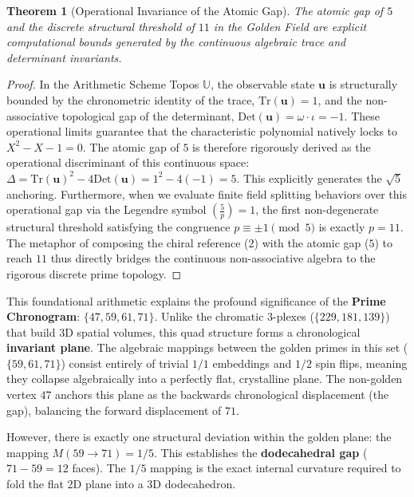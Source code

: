 \documentclass[12pt,oneside]{article}
\theoremstyle{principia}
\newtheorem{theorem}{Theorem}[section]
\theoremstyle{definition}
\theoremstyle{remark}
\begin{document}
\begin{theorem}[Operational Invariance of the Atomic Gap]
The atomic gap of $5$ and the discrete structural threshold of $11$ in the Golden Field are explicit computational bounds generated by the continuous algebraic trace and determinant invariants.
\end{theorem}

\begin{proof}
In the Arithmetic Scheme Topos $\mathbb{U}$, the observable state $\mathbf{u}$ is structurally bounded by the chronometric identity of the trace, $\mathrm{Tr}(\mathbf{u}) = 1$, and the non-associative topological gap of the determinant, $\mathrm{Det}(\mathbf{u}) = \omega \cdot \iota = -1$. These operational limits guarantee that the characteristic polynomial natively locks to $X^2 - X - 1 = 0$. The atomic gap of $5$ is therefore rigorously derived as the operational discriminant of this continuous space: $\Delta = \mathrm{Tr}(\mathbf{u})^2 - 4\mathrm{Det}(\mathbf{u}) = 1^2 - 4(-1) = 5$. This explicitly generates the $\sqrt{5}$ anchoring. Furthermore, when we evaluate finite field splitting behaviors over this operational gap via the Legendre symbol $\left(\frac{5}{p}\right) = 1$, the first non-degenerate structural threshold satisfying the congruence $p \equiv \pm 1 \pmod 5$ is exactly $p = 11$. The metaphor of composing the chiral reference ($2$) with the atomic gap ($5$) to reach $11$ thus directly bridges the continuous non-associative algebra to the rigorous discrete prime topology. \qedhere
\end{proof}

This foundational arithmetic explains the profound significance of the \textbf{Prime Chronogram}: $\{47, 59, 61, 71\}$. Unlike the chromatic $3$-plexes ($\{229, 181, 139\}$) that build 3D spatial volumes, this quad structure forms a chronological \textbf{invariant plane}. The algebraic mappings between the golden primes in this set ($\{59, 61, 71\}$) consist entirely of trivial $1/1$ embeddings and $1/2$ spin flips, meaning they collapse algebraically into a perfectly flat, crystalline plane. The non-golden vertex $47$ anchors this plane as the backwards chronological displacement (the gap), balancing the forward displacement of $71$.

However, there is exactly one structural deviation within the golden plane: the mapping $M(59 \to 71) = 1/5$. This establishes the \textbf{dodecahedral gap} ($71 - 59 = 12$ faces). The $1/5$ mapping is the exact internal curvature required to fold the flat 2D plane into a 3D dodecahedron. 
\end{document}
